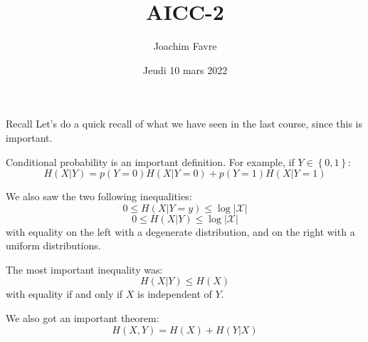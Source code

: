\documentclass[a4paper]{article}
\title{AICC-2}
\author{Joachim Favre}
\date{Jeudi 10 mars 2022}
\begin{document}
\maketitle


\begin{parag}{Recall}
    Let's do a quick recall of what we have seen in the last course, since this is important.

    Conditional probability is an important definition. For example, if $Y \in \left\{0, 1\right\}$:
    \[H\left(X|Y\right) = p\left(Y = 0\right) H\left(X|Y=0\right) + p\left(Y=1\right) H\left(X|Y=1\right)\]
    
    We also saw the two following inequalities:
    \[0 \leq H\left(X | Y=y\right) \leq \log\left|\mathcal{X}\right|\]
    \[0 \leq H\left(X | Y\right) \leq \log\left|\mathcal{X}\right|\]
    with equality on the left with a degenerate distribution, and on the right with a uniform distributions.

    The most important inequality was:
    \[H\left(X|Y\right) \leq H\left(X\right)\]
    with equality if and only if $X$ is independent of $Y$.

    We also got an important theorem: 
    \[H\left(X, Y\right) = H\left(X\right) + H\left(Y | X\right)\]
\end{parag}
\end{document}
